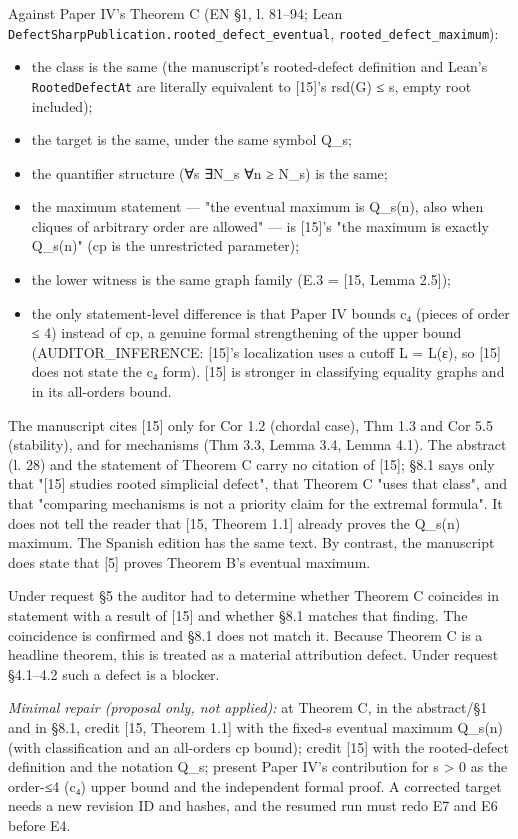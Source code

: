 \documentclass[10pt,a4paper]{article}
\begin{document}
Against Paper IV's Theorem C (EN §1, l. 81–94; Lean \texttt{DefectSharpPublication.rooted\_defect\_eventual},
\texttt{rooted\_defect\_maximum}):

\begin{itemize}\item the class is the same (the manuscript's rooted-defect definition and Lean's \texttt{RootedDefectAt} are literally equivalent to [15]'s rsd(G) ≤ s, empty root included);\item the target is the same, under the same symbol Q\_s;\item the quantifier structure (∀s ∃N\_s ∀n ≥ N\_s) is the same;\item the maximum statement — "the eventual maximum is Q\_s(n), also when cliques of arbitrary order are allowed" — is [15]'s "the maximum is exactly Q\_s(n)" (cp is the unrestricted parameter);\item the lower witness is the same graph family (E.3 = [15, Lemma 2.5]);\item the only statement-level difference is that Paper IV bounds c₄ (pieces of order ≤ 4) instead of cp, a genuine formal strengthening of the upper bound (AUDITOR\_INFERENCE: [15]'s localization uses a cutoff L = L(ε), so [15] does not state the c₄ form). [15] is stronger in classifying equality graphs and in its all-orders bound.\end{itemize}

The manuscript cites [15] only for Cor 1.2 (chordal case), Thm 1.3 and Cor 5.5 (stability), and for mechanisms
(Thm 3.3, Lemma 3.4, Lemma 4.1). The abstract (l. 28) and the statement of Theorem C carry no citation of [15];
§8.1 says only that "[15] studies rooted simplicial defect", that Theorem C "uses that class", and that
"comparing mechanisms is not a priority claim for the extremal formula". It does not tell the reader that
[15, Theorem 1.1] already proves the Q\_s(n) maximum. The Spanish edition has the same text. By contrast, the
manuscript does state that [5] proves Theorem B's eventual maximum.

Under request §5 the auditor had to determine whether Theorem C coincides in statement with a result of [15] and
whether §8.1 matches that finding. The coincidence is confirmed and §8.1 does not match it. Because Theorem C is
a headline theorem, this is treated as a material attribution defect. Under request §4.1–4.2 such a defect is a
blocker.

\emph{Minimal repair (proposal only, not applied):} at Theorem C, in the abstract/§1 and in §8.1, credit
[15, Theorem 1.1] with the fixed-s eventual maximum Q\_s(n) (with classification and an all-orders cp bound); credit
[15] with the rooted-defect definition and the notation Q\_s; present Paper IV's contribution for s > 0 as the
order-≤4 (c₄) upper bound and the independent formal proof. A corrected target needs a new revision ID and
hashes, and the resumed run must redo E7 and E6 before E4.
\end{document}
